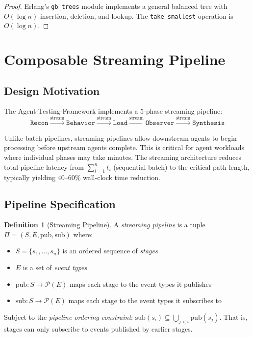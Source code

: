 \documentclass[12pt,a4paper]{article}
\theoremstyle{definition}
\newtheorem{definition}[theorem]{Definition}
\theoremstyle{remark}
\begin{document}
\begin{proof}
Erlang's \texttt{gb\_trees} module implements a general balanced tree with $O(\log n)$ insertion, deletion, and lookup. The \texttt{take\_smallest} operation is $O(\log n)$.
\end{proof}

\section{Composable Streaming Pipeline}\label{sec:pipeline}

\subsection{Design Motivation}

The Agent-Testing-Framework implements a 5-phase streaming pipeline:
\begin{equation}\label{eq:testing-pipeline}
  \texttt{Recon} \xrightarrow{\text{stream}} \texttt{Behavior} \xrightarrow{\text{stream}} \texttt{Load} \xrightarrow{\text{stream}} \texttt{Observer} \xrightarrow{\text{stream}} \texttt{Synthesis}
\end{equation}

Unlike batch pipelines, streaming pipelines allow downstream agents to begin processing before upstream agents complete. This is critical for agent workloads where individual phases may take minutes. The streaming architecture reduces total pipeline latency from $\sum_{i=1}^{n} t_i$ (sequential batch) to the critical path length, typically yielding 40--60\% wall-clock time reduction.

\subsection{Pipeline Specification}

\begin{definition}[Streaming Pipeline]\label{def:streaming-pipeline}
A \emph{streaming pipeline} is a tuple $\Pi = (S, E, \text{pub}, \text{sub})$ where:
\begin{itemize}[leftmargin=2em]
  \item $S = \{s_1, \ldots, s_n\}$ is an ordered sequence of \emph{stages}
  \item $E$ is a set of \emph{event types}
  \item $\text{pub}: S \to \mathcal{P}(E)$ maps each stage to the event types it publishes
  \item $\text{sub}: S \to \mathcal{P}(E)$ maps each stage to the event types it subscribes to
\end{itemize}
Subject to the \emph{pipeline ordering constraint}: $\text{sub}(s_i) \subseteq \bigcup_{j < i} \text{pub}(s_j)$. That is, stages can only subscribe to events published by earlier stages.
\end{definition}
\end{document}

